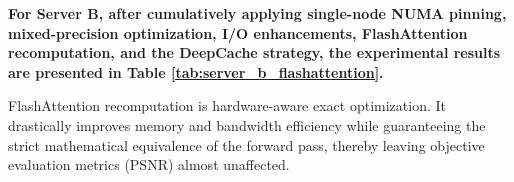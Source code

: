 
\textbf{For Server B, after cumulatively applying single-node NUMA pinning, mixed-precision optimization, I/O enhancements, FlashAttention recomputation, and the DeepCache strategy, the experimental results are presented in Table \ref{tab:server_b_flashattention}.}

FlashAttention recomputation is hardware-aware exact optimization. It drastically improves memory and bandwidth efficiency while guaranteeing the strict mathematical equivalence of the forward pass, thereby leaving objective evaluation metrics (PSNR) almost unaffected.

